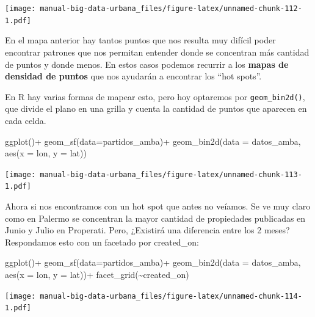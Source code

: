 \documentclass[
  spanish,
]{book}
\newenvironment{Shaded}{\begin{snugshade}}{\end{snugshade}}
\newcommand{\AttributeTok}[1]{\textcolor[rgb]{0.77,0.63,0.00}{#1}}
\newcommand{\FunctionTok}[1]{\textcolor[rgb]{0.00,0.00,0.00}{#1}}
\newcommand{\NormalTok}[1]{#1}
\newcommand{\SpecialCharTok}[1]{\textcolor[rgb]{0.00,0.00,0.00}{#1}}
\begin{document}
\texttt{[image: manual-big-data-urbana\_files/figure-latex/unnamed-chunk-112-1.pdf]}

En el mapa anterior hay tantos puntos que nos resulta muy difícil poder encontrar patrones que nos permitan entender donde se concentran más cantidad de puntos y donde menos. En estos casos podemos recurrir a los \textbf{mapas de densidad de puntos} que nos ayudarán a encontrar los ``hot spots''.

En R hay varias formas de mapear esto, pero hoy optaremos por \texttt{geom\_bin2d()}, que divide el plano en una grilla y cuenta la cantidad de puntos que aparecen en cada celda.

\begin{Shaded}
\begin{Highlighting}[]
\FunctionTok{ggplot}\NormalTok{()}\SpecialCharTok{+}
  \FunctionTok{geom\_sf}\NormalTok{(}\AttributeTok{data=}\NormalTok{partidos\_amba)}\SpecialCharTok{+}
  \FunctionTok{geom\_bin2d}\NormalTok{(}\AttributeTok{data =}\NormalTok{ datos\_amba, }\FunctionTok{aes}\NormalTok{(}\AttributeTok{x =}\NormalTok{ lon, }\AttributeTok{y =}\NormalTok{ lat))}
\end{Highlighting}
\end{Shaded}

\texttt{[image: manual-big-data-urbana\_files/figure-latex/unnamed-chunk-113-1.pdf]}

Ahora si nos encontramos con un hot spot que antes no veíamos. Se ve muy claro como en Palermo se concentran la mayor cantidad de propiedades publicadas en Junio y Julio en Properati. Pero, ¿Existirá una diferencia entre los 2 meses? Respondamos esto con un facetado por created\_on:

\begin{Shaded}
\begin{Highlighting}[]
\FunctionTok{ggplot}\NormalTok{()}\SpecialCharTok{+}
  \FunctionTok{geom\_sf}\NormalTok{(}\AttributeTok{data=}\NormalTok{partidos\_amba)}\SpecialCharTok{+}
  \FunctionTok{geom\_bin2d}\NormalTok{(}\AttributeTok{data =}\NormalTok{ datos\_amba, }\FunctionTok{aes}\NormalTok{(}\AttributeTok{x =}\NormalTok{ lon, }\AttributeTok{y =}\NormalTok{ lat))}\SpecialCharTok{+}
  \FunctionTok{facet\_grid}\NormalTok{(}\SpecialCharTok{\textasciitilde{}}\NormalTok{created\_on)}
\end{Highlighting}
\end{Shaded}

\texttt{[image: manual-big-data-urbana\_files/figure-latex/unnamed-chunk-114-1.pdf]}
\end{document}
